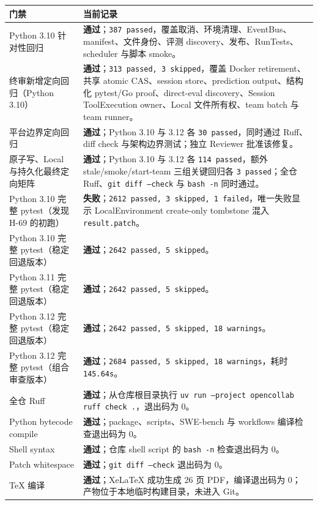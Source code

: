 \documentclass[11pt,a4paper,fontset=fandol]{ctexart}
\newcommand{\Pass}{\textcolor{passgreen}{\textbf{通过}}}
\newcommand{\code}[1]{\texttt{#1}}
\begin{document}
\begin{longtable}{>{\raggedright\arraybackslash}p{5.1cm}>{\raggedright\arraybackslash}p{8.8cm}}
\toprule
门禁 & 当前记录 \\
\midrule
Python 3.10 针对性回归 & \Pass；\code{387 passed}，覆盖取消、环境清理、EventBus、manifest、文件身份、评测 discovery、发布、RunTests、scheduler 与脚本 smoke。 \\
终审新增定向回归（Python 3.10） & \Pass；\code{313 passed, 3 skipped}，覆盖 Docker retirement、共享 atomic CAS、session store、prediction output、结构化 pytest/Go proof、direct-eval discovery、Session ToolExecution owner、Local 文件所有权、team batch 与 team runner。 \\
平台边界定向回归 & \Pass；Python 3.10 与 3.12 各 \code{30 passed}，同时通过 Ruff、diff check 与架构边界测试；独立 Reviewer 批准该修复。 \\
原子写、Local 与持久化最终定向矩阵 & \Pass；Python 3.10 与 3.12 各 \code{114 passed}，额外 stale/smoke/start-team 三组关键回归各 \code{3 passed}；全仓 Ruff、\code{git diff --check} 与 \code{bash -n} 同时通过。 \\
Python 3.10 完整 pytest（发现 H-69 的初跑） & \textcolor{critical}{\textbf{失败}}；\code{2612 passed, 3 skipped, 1 failed}，唯一失败显示 LocalEnvironment create-only tombstone 混入 \code{result.patch}。 \\
Python 3.10 完整 pytest（稳定回退版本） & \Pass；\code{2642 passed, 5 skipped}。 \\
Python 3.11 完整 pytest（稳定回退版本） & \Pass；\code{2642 passed, 5 skipped}。 \\
Python 3.12 完整 pytest（稳定回退版本） & \Pass；\code{2642 passed, 5 skipped, 18 warnings}。 \\
Python 3.12 完整 pytest（组合审查版本） & \Pass；\code{2684 passed, 5 skipped, 18 warnings}，耗时 \code{145.64s}。 \\
全仓 Ruff & \Pass；从仓库根目录执行 \code{uv run --project opencollab ruff check .}，退出码为 0。 \\
Python bytecode compile & \Pass；package、scripts、SWE-bench 与 workflows 编译检查退出码为 0。 \\
Shell syntax & \Pass；仓库 shell script 的 \code{bash -n} 检查退出码为 0。 \\
Patch whitespace & \Pass；\code{git diff --check} 退出码为 0。 \\
TeX 编译 & \Pass；XeLaTeX 成功生成 26 页 PDF，编译退出码为 0；产物位于本地临时构建目录，未进入 Git。 \\
\bottomrule
\end{longtable}
\end{document}
